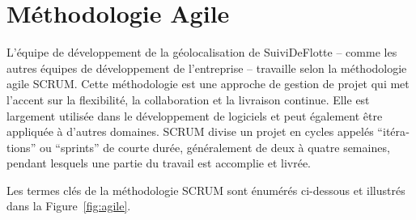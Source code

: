 \section{Méthodologie Agile}\label{sec:agile}

L'équipe de développement de la géolocalisation de SuiviDeFlotte -- comme les autres équipes de développement de l'entreprise -- travaille selon la méthodologie agile SCRUM. Cette méthodologie est une approche de gestion de projet qui met l'accent sur la flexibilité, la collaboration et la livraison continue. Elle est largement utilisée dans le développement de logiciels et peut également être appliquée à d'autres domaines. SCRUM divise un projet en cycles appelés \foreignquote{french}{itérations} ou \foreignquote{french}{sprints} de courte durée, généralement de deux à quatre semaines, pendant lesquels une partie du travail est accomplie et livrée.

Les termes clés de la méthodologie SCRUM sont énumérés ci-dessous et illustrés dans la Figure~\ref{fig:agile}.

